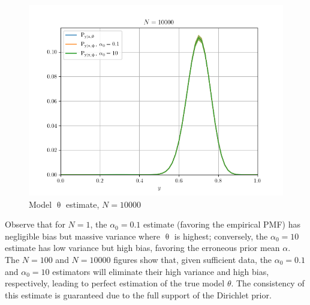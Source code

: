 \documentclass[12pt]{report}
\begin{document}
\begin{figure}
\centering
\includegraphics[width=0.8\linewidth]{model_est/N_10000.png}
\caption{Model $\uptheta$ estimate, $N=10000$}
\label{fig:model_est/N_10000}
\end{figure}

Observe that for $N = 1$, the $\alpha_0 = 0.1$ estimate (favoring the empirical PMF) has negligible bias but massive variance where $\uptheta$ is highest; conversely, the $\alpha_0 = 10$ estimate has low variance but high bias, favoring the erroneous prior mean $\alpha$. The $N=100$ and $N=10000$ figures show that, given sufficient data, the $\alpha_0 = 0.1$ and $\alpha_0 = 10$ estimators will eliminate their high variance and high bias, respectively, leading to perfect estimation of the true model $\theta$. The consistency of this estimate is guaranteed due to the full support of the Dirichlet prior.
\end{document}
